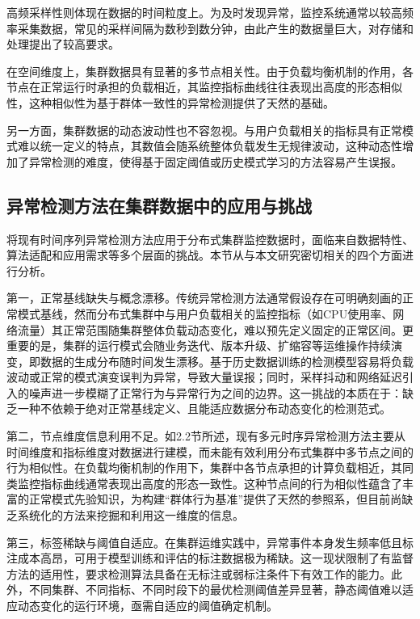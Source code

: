 高频采样性则体现在数据的时间粒度上。为及时发现异常，监控系统通常以较高频率采集数据，常见的采样间隔为数秒到数分钟，由此产生的数据量巨大，对存储和处理提出了较高要求。

在空间维度上，集群数据具有显著的多节点相关性。由于负载均衡机制的作用，各节点在正常运行时承担的负载相近，其监控指标曲线往往表现出高度的形态相似性，这种相似性为基于群体一致性的异常检测提供了天然的基础。

另一方面，集群数据的动态波动性也不容忽视。与用户负载相关的指标具有正常模式难以统一定义的特点，其数值会随系统整体负载发生无规律波动，这种动态性增加了异常检测的难度，使得基于固定阈值或历史模式学习的方法容易产生误报。

\subsection{异常检测方法在集群数据中的应用与挑战}

将现有时间序列异常检测方法应用于分布式集群监控数据时，面临来自数据特性、算法适配和应用需求等多个层面的挑战\cite{chen2025tsadsurvey}。本节从与本文研究密切相关的四个方面进行分析。

第一，正常基线缺失与概念漂移。传统异常检测方法通常假设存在可明确刻画的正常模式基线，然而分布式集群中与用户负载相关的监控指标（如CPU使用率、网络流量）其正常范围随集群整体负载动态变化，难以预先定义固定的正常区间。更重要的是，集群的运行模式会随业务迭代、版本升级、扩缩容等运维操作持续演变，即数据的生成分布随时间发生漂移\cite{chen2025tsadsurvey}。基于历史数据训练的检测模型容易将负载波动或正常的模式演变误判为异常，导致大量误报；同时，采样抖动和网络延迟引入的噪声进一步模糊了正常行为与异常行为之间的边界。这一挑战的本质在于：缺乏一种不依赖于绝对正常基线定义、且能适应数据分布动态变化的检测范式。

第二，节点维度信息利用不足。如2.2节所述，现有多元时序异常检测方法主要从时间维度和指标维度对数据进行建模，而未能有效利用分布式集群中多节点之间的行为相似性。在负载均衡机制的作用下，集群中各节点承担的计算负载相近，其同类监控指标曲线通常表现出高度的形态一致性。这种节点间的行为相似性蕴含了丰富的正常模式先验知识，为构建``群体行为基准''提供了天然的参照系，但目前尚缺乏系统化的方法来挖掘和利用这一维度的信息。

第三，标签稀缺与阈值自适应。在集群运维实践中，异常事件本身发生频率低且标注成本高昂，可用于模型训练和评估的标注数据极为稀缺\cite{chen2025tsadsurvey}。这一现状限制了有监督方法的适用性，要求检测算法具备在无标注或弱标注条件下有效工作的能力。此外，不同集群、不同指标、不同时段下的最优检测阈值差异显著，静态阈值难以适应动态变化的运行环境，亟需自适应的阈值确定机制。

